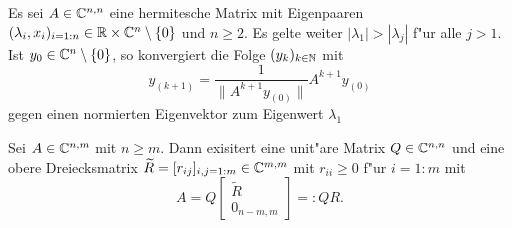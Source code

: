 \newpage

\begin{thm}[Potenzmethode]\label{thm:appTheorems:Potenzmethode} Es sei $A\in\mathbb{C}^{n,n}$ eine hermitesche Matrix mit Eigenpaaren $(\lambda_i,x_i)_{i=1:n} \in \mathbb{R}\times\mathbb{C}^n \setminus\{0\}$ und $n\ge 2$.
Es gelte weiter $|\lambda_1| > |\lambda_j|$ f"ur alle
$j > 1$. Ist $y_0 \in\mathbb{C}^n \setminus\{0\}$, so konvergiert die Folge
$(y_k)_{k\in\mathbb{N}}$ mit
\[
y_{(k+1)} = \frac{1}{\|A^{k+1} y_{(0)}\|} A^{k+1}y_{(0)}
\]
gegen einen normierten Eigenvektor zum Eigenwert $\lambda_1$
\end{thm}

\begin{thm}[QR-Zerlegung]\label{thm:appTheorems:QR}
Sei $A\in\mathbb{C}^{n,m}$ mit $n\ge m$. Dann exisitert eine unit"are Matrix $Q\in\mathbb{C}^{n,n}$ und eine obere Dreiecksmatrix $\widetilde{R} = [r_{ij}]_{i,j=1:m}\in\mathbb{C}^{m,m}$ mit $r_{ii}\ge 0$ f"ur $i=1:m$ mit
\[
A = Q\begin{bmatrix} \widetilde{R} \\ 0_{n-m,m} \end{bmatrix} =: QR.
\]
\end{thm}
